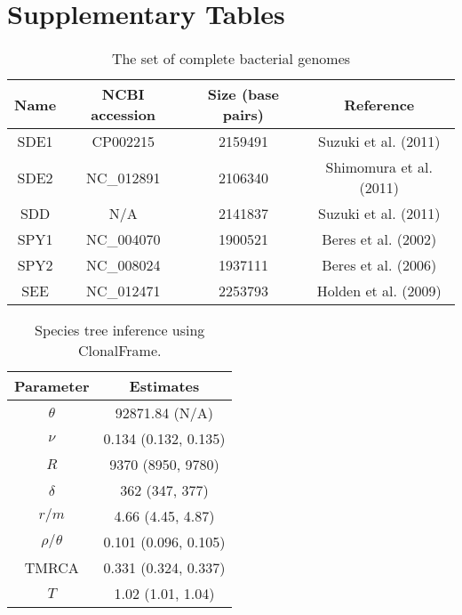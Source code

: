 \documentclass[english]{article}
\providecommand{\tabularnewline}{\\}
\begin{document}
\section*{Supplementary Tables}
\clearpage{}

\begin{table}
\caption{\label{tab:genome}The set of complete bacterial genomes}
\noindent \begin{centering}
\begin{tabular}{cccc}
\hline 
Name & NCBI accession & Size (base pairs) & Reference\tabularnewline
\hline
SDE1 & CP002215 & 2159491 & Suzuki et al. (2011)\tabularnewline
SDE2 & NC\_012891 & 2106340 & Shimomura et al. (2011)\tabularnewline
SDD & N/A & 2141837 & Suzuki et al. (2011)\tabularnewline
SPY1 & NC\_004070 & 1900521 & Beres et al. (2002)\tabularnewline
SPY2 & NC\_008024 & 1937111 & Beres et al. (2006)\tabularnewline
SEE & NC\_012471 & 2253793 & Holden et al. (2009)\tabularnewline
\hline
\end{tabular}
\par\end{centering}
\end{table}
\clearpage{}

\begin{table}
\caption{\label{tab:clonalframe}Species tree inference using ClonalFrame.}
\noindent \centering{}\begin{tabular}{cc}
Parameter & Estimates\tabularnewline
\hline
$\theta$ & 92871.84 (N/A)\tabularnewline
$\nu$ & 0.134 (0.132, 0.135)\tabularnewline
$R$ & 9370 (8950, 9780)\tabularnewline
$\delta$ & 362 (347, 377)\tabularnewline
$r/m$ & 4.66 (4.45, 4.87)\tabularnewline
$\rho/\theta$ & 0.101 (0.096, 0.105)\tabularnewline
TMRCA & 0.331 (0.324, 0.337)\tabularnewline
$T$ & 1.02 (1.01, 1.04)\tabularnewline
\hline
\end{tabular}
\end{table}
\clearpage{}
\end{document}
